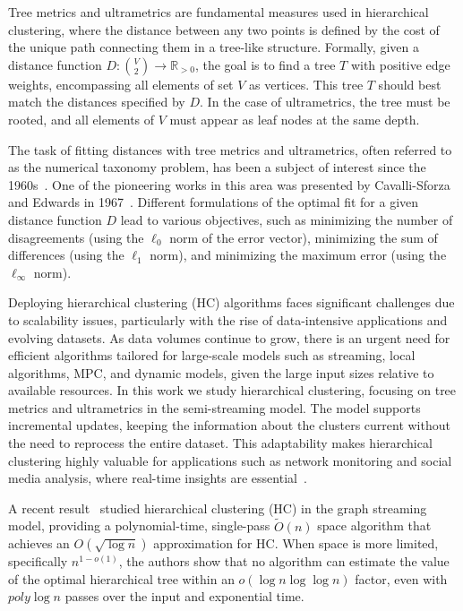 \documentclass{article}
\begin{document}
Tree metrics and ultrametrics are fundamental measures used in hierarchical clustering, where the distance between any two points is defined by the cost of the unique path connecting them in a tree-like structure. Formally, given a distance function \( D: \binom{V}{2} \rightarrow \mathbb{R}_{>0} \), the goal is to find a tree \( T \) with positive edge weights, encompassing all elements of set \( V \) as vertices. This tree \( T \) should best match the distances specified by \( D \). In the case of ultrametrics, the tree must be rooted, and all elements of $V$ must appear as leaf nodes at the same depth.

The task of fitting distances with tree metrics and ultrametrics, often referred to as the numerical taxonomy problem, has been a subject of interest since the 1960s~\cite{4-cavalli67, sneath1962numerical, 7-Sneath-Numerical-1963}. One of the pioneering works in this area was presented by Cavalli-Sforza and Edwards in 1967~\cite{4-cavalli67}. Different formulations of the optimal fit for a given distance function \( D \) lead to various objectives, such as minimizing the number of disagreements (using the \( \ell_0 \) norm of the error vector), minimizing the sum of differences (using the \( \ell_1 \) norm), and minimizing the maximum error (using the \( \ell_\infty \) norm).

Deploying hierarchical clustering (HC) algorithms faces significant challenges due to scalability issues, particularly with the rise of data-intensive applications and evolving datasets. As data volumes continue to grow, there is an urgent need for efficient algorithms tailored for large-scale models such as streaming, local algorithms, MPC, and dynamic models, given the large input sizes relative to available resources. In this work we study hierarchical clustering, focusing on tree metrics and ultrametrics in the semi-streaming model.
The model supports incremental updates, keeping the information about the clusters current without the need to reprocess the entire dataset.
This adaptability makes hierarchical clustering highly valuable for applications such as network monitoring and social media analysis, where real-time insights are essential~\cite{rodrigues2008hierarchical, lee2014incremental,luhr2009incremental}.

A recent result~\cite{AssadiCLMW22} studied hierarchical clustering (HC) in the graph streaming model, providing a polynomial-time, single-pass \(\tilde{O}(n)\) space algorithm that achieves an \(O(\sqrt{\log n})\) approximation for HC. When space is more limited, specifically \(n^{1-o(1)}\), the authors show that no algorithm can estimate the value of the optimal hierarchical tree within an \(o(\log n \log \log n)\) factor, even with \(poly\log n\) passes over the input and exponential time. 
\end{document}
